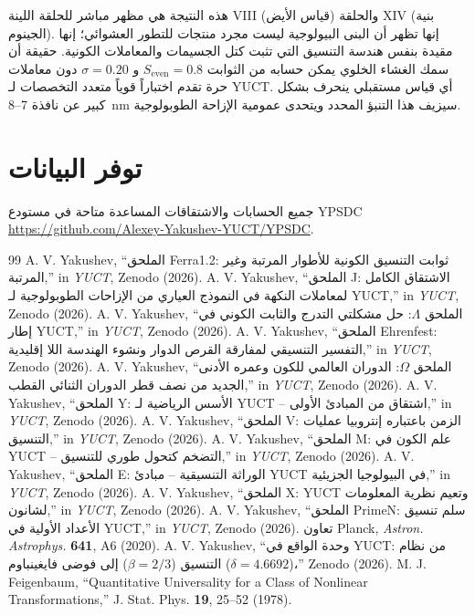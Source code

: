 \documentclass[12pt,a4paper]{article}
\begin{document}
	هذه النتيجة هي مظهر مباشر للحلقة اللينة VIII (قياس الأيض) والحلقة XIV (بنية الجينوم). إنها تظهر أن البنى البيولوجية ليست مجرد منتجات للتطور العشوائي؛ إنها مقيدة بنفس هندسة التنسيق التي تثبت كتل الجسيمات والمعاملات الكونية. حقيقة أن سمك الغشاء الخلوي يمكن حسابه من الثوابت \(S_{\mathrm{even}} = 0.8\) و \(\sigma = 0.20\) دون معاملات حرة تقدم اختباراً قوياً متعدد التخصصات لـ YUCT. أي قياس مستقبلي ينحرف بشكل كبير عن نافذة 7–8~nm سيزيف هذا التنبؤ المحدد ويتحدى عمومية الإزاحة الطوبولوجية.
	
	\section*{توفر البيانات}
	جميع الحسابات والاشتقاقات المساعدة متاحة في مستودع YPSDC \url{https://github.com/Alexey-Yakushev-YUCT/YPSDC}.
	
	\begin{thebibliography}{99}
		 A. V. Yakushev, ``الملحق Ferra1.2: ثوابت التنسيق الكونية للأطوار المرتبة وغير المرتبة,'' in \emph{YUCT}, Zenodo (2026).
		 A. V. Yakushev, ``الملحق J: الاشتقاق الكامل لمعاملات النكهة في النموذج العياري من الإزاحات الطوبولوجية لـ YUCT,'' in \emph{YUCT}, Zenodo (2026).
		 A. V. Yakushev, ``الملحق \(\Lambda\): حل مشكلتي التدرج والثابت الكوني في إطار YUCT,'' in \emph{YUCT}, Zenodo (2026).
		 A. V. Yakushev, ``الملحق Ehrenfest: التفسير التنسيقي لمفارقة القرص الدوار ونشوء الهندسة اللا إقليدية,'' in \emph{YUCT}, Zenodo (2026).
		 A. V. Yakushev, ``الملحق \(\Omega\): الدوران العالمي للكون وعمره الأدنى الجديد من نصف قطر الدوران الثنائي القطب,'' in \emph{YUCT}, Zenodo (2026).
		 A. V. Yakushev, ``الملحق Y: الأسس الرياضية لـ YUCT – اشتقاق من المبادئ الأولى,'' in \emph{YUCT}, Zenodo (2026).
		 A. V. Yakushev, ``الملحق V: الزمن باعتباره إنتروبيا عمليات التنسيق,'' in \emph{YUCT}, Zenodo (2026).
		 A. V. Yakushev, ``الملحق M: علم الكون في YUCT – التضخم كتحول طوري للتنسيق,'' in \emph{YUCT}, Zenodo (2026).
		 A. V. Yakushev, ``الملحق E: الوراثة التنسيقية – مبادئ YUCT في البيولوجيا الجزيئية,'' in \emph{YUCT}, Zenodo (2026).
		 A. V. Yakushev, ``الملحق X: YUCT وتعيم نظرية المعلومات لشانون,'' in \emph{YUCT}, Zenodo (2026).
		 A. V. Yakushev, ``الملحق PrimeN: سلم تنسيق الأعداد الأولية في YUCT,'' in \emph{YUCT}, Zenodo (2026).
		 تعاون Planck, \emph{Astron. Astrophys.} \textbf{641}, A6 (2020).
		 A. V. Yakushev, ``وحدة الواقع في YUCT: من نظام التنسيق (\(\beta = 2/3\)) إلى فوضى فايغينباوم (\(\delta = 4.6692\))،'' Zenodo (2026).
		 M. J. Feigenbaum, ``Quantitative Universality for a Class of Nonlinear Transformations,'' J. Stat. Phys. \textbf{19}, 25–52 (1978).
	\end{thebibliography}
	
\end{document}
